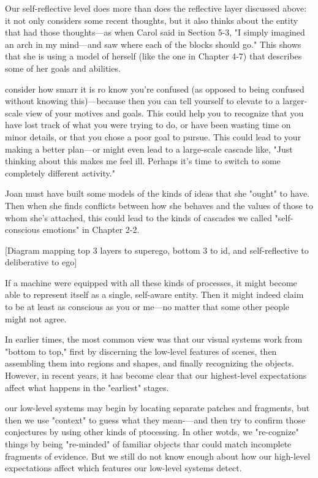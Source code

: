 \documentclass[10pt,a4paper]{article}
\begin{document}
Our self-reflective level does more than does the reflective layer discussed above: it not only considers some recent thoughts, but it also thinks about the entity that had those thoughts—as when Carol said in Section 5-3, "I simply imagined an arch in my mind—and saw where each of the blocks should go." This shows that she is using a model of herself (like the one in Chapter 4-7) that describes some of her goals and abilities. \cite[p.~144]{minsky}

consider how smarr it is ro know you're confused (as opposed to being confused without knowing this)—because then you can tell yourself to elevate to a larger-scale view of your motives and goals. This could help you to recognize that you have lost track of what you were trying to do, or have been wasting time on minor details, or that you chose a poor goal to pursue. This could lead to your making a better plan—or might even lead to a large-scale cascade like, "Just thinking about this makes me feel ill. Perhaps it's time to switch to some completely different activity." \cite[p.~145]{minsky}

Joan must have built some models of the kinds of ideas that she "ought" to have. Then when she finds conflicts between how she behaves and the values of those to whom she's attached, this could lead to the kinds of cascades we called "self-conscious emotions" in Chapter 2-2. \cite[p.~146]{minsky}

[Diagram mapping top 3 layers to superego, bottom 3 to id, and self-reflective to deliberative to ego] \cite[p.~148]{minsky}

If a machine were equipped with all these kinds of processes, it might become able to represent itself as a single, self-aware entity. Then it might indeed claim to be at least as conscious as you or me—no matter that some other people might not agree. \cite[p.~148]{minsky}

In earlier times, the most common view was that our visual systems work from "bottom to top," first by discerning the low-level features of scenes, then assembling them into regions and shapes, and finally recognizing the objects. However, in recent years, it has become clear that our highest-level expectations affect what happens in the "earliest" stages. \cite[p.~152]{minsky}

our low-level systems may begin by locating separate patches and fragments, but then we use "context" to guess what they mean-—and then try to confirm those conjectures by using other kinds of ptocessing. In other wotds, we "re-cognize" things by being "re-minded" of familiar objects thar could match incomplete fragments of evidence. But we still do not know enough about how our high-level expectations affect which features our low-level systems detect. \cite[p.~154]{minsky}
\end{document}
